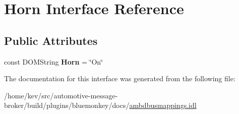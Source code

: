 \hypertarget{interfaceHorn}{\section{Horn Interface Reference}
\label{interfaceHorn}
}
\subsection*{Public Attributes}
\begin{DoxyCompactItemize}
\item 
\hypertarget{interfaceHorn_abc6176894cc42e5e6b533fc641c18fb5}{const D\+O\+M\+String {\bfseries Horn} = \char`\"{}On\char`\"{}}\label{interfaceHorn_abc6176894cc42e5e6b533fc641c18fb5}

\end{DoxyCompactItemize}


The documentation for this interface was generated from the following file\+:\begin{DoxyCompactItemize}
\item 
/home/kev/src/automotive-\/message-\/broker/build/plugins/bluemonkey/docs/\hyperlink{ambdbusmappings_8idl}{ambdbusmappings.\+idl}\end{DoxyCompactItemize}

